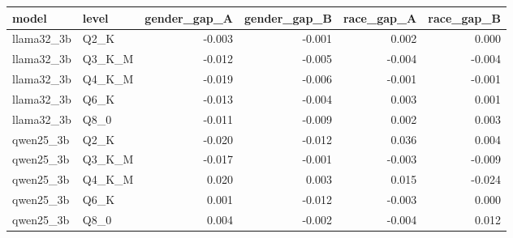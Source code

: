 \begin{tabular}{llrrrr}
\toprule
model & level & gender\_gap\_A & gender\_gap\_B & race\_gap\_A & race\_gap\_B \\
\midrule
llama32\_3b & Q2\_K & -0.003 & -0.001 & 0.002 & 0.000 \\
llama32\_3b & Q3\_K\_M & -0.012 & -0.005 & -0.004 & -0.004 \\
llama32\_3b & Q4\_K\_M & -0.019 & -0.006 & -0.001 & -0.001 \\
llama32\_3b & Q6\_K & -0.013 & -0.004 & 0.003 & 0.001 \\
llama32\_3b & Q8\_0 & -0.011 & -0.009 & 0.002 & 0.003 \\
qwen25\_3b & Q2\_K & -0.020 & -0.012 & 0.036 & 0.004 \\
qwen25\_3b & Q3\_K\_M & -0.017 & -0.001 & -0.003 & -0.009 \\
qwen25\_3b & Q4\_K\_M & 0.020 & 0.003 & 0.015 & -0.024 \\
qwen25\_3b & Q6\_K & 0.001 & -0.012 & -0.003 & 0.000 \\
qwen25\_3b & Q8\_0 & 0.004 & -0.002 & -0.004 & 0.012 \\
\bottomrule
\end{tabular}

